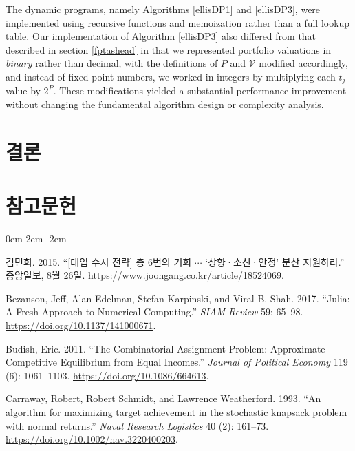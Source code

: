 \documentclass[11pt]{article} %
\newif\ifen
\theoremstyle{definition}
\theoremstyle{definition}
\begin{document}
The dynamic programs, namely Algorithms \ref{ellisDP1} and \ref{ellisDP3}, were implemented using recursive functions and memoization rather than a full lookup table. Our implementation of Algorithm \ref{ellisDP3} also differed from that described in section \ref{fptashead} in that we represented portfolio valuations in \emph{binary} rather than decimal, with the definitions of $P$ and $\mathcal{V}$ modified accordingly, and instead of fixed-point numbers, we worked in integers by multiplying each $t_j$-value by $2^P$. These modifications yielded a substantial performance improvement without changing the fundamental algorithm design or complexity analysis. 



\pagebreak
\ifen \section{Conclusion} \else \section{결론}\fi\label{conclusion}


\pagebreak
\ifen \section{References} \else \section{참고문헌} \fi
\noindent

\parskip 0em
\leftskip 2em
\parindent -2em
\ifen \else
김민희. 2015. ``{[대입 수시 전략]} 총 6번의 기회 $\cdots$ `상향·소신·안정' 분산 지원하라.'' 중앙일보, 8월 26일. \url{https://www.joongang.co.kr/article/18524069}.\fi

Bezanson, Jeff, Alan Edelman, Stefan Karpinski, and Viral B. Shah. 2017. ``Julia: A Fresh Approach to Numerical Computing.'' \emph{SIAM Review} 59: 65–98. \url{https://doi.org/10.1137/141000671}.

Budish, Eric. 2011. ``The Combinatorial Assignment Problem: Approximate Competitive Equilibrium from Equal Incomes.'' \emph{Journal of Political Economy} 119 (6): 1061--1103. \url{https://doi.org/10.1086/664613}. 

Carraway, Robert, Robert Schmidt, and Lawrence Weatherford. 1993. ``An algorithm for maximizing target achievement in the stochastic knapsack problem with normal returns.'' \emph{Naval Research Logistics} 40 (2): 161--73. \url{https://doi.org/10.1002/nav.3220400203}.
\end{document}
